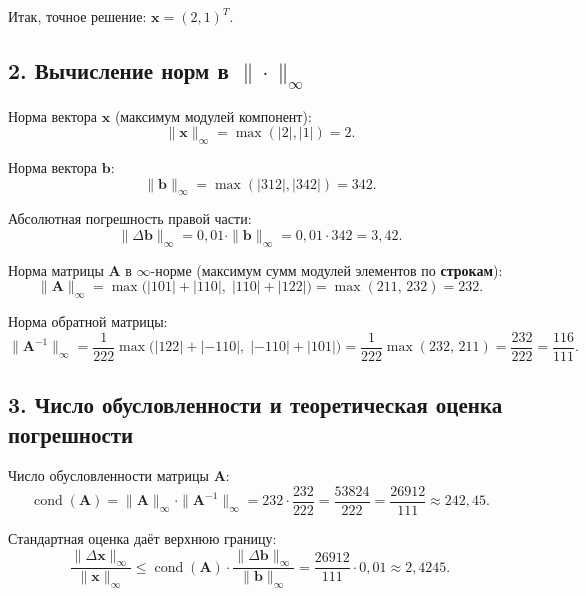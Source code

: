 \documentclass{article}
\begin{document}
Итак, точное решение: $\mathbf{x} = (2, 1)^T$.

\subsection*{2. Вычисление норм в $\|\cdot\|_\infty$}

Норма вектора $\mathbf{x}$ (максимум модулей компонент):
\begin{equation}
\|\mathbf{x}\|_\infty = \max(|2|, |1|) = 2.
\end{equation}

Норма вектора $\mathbf{b}$:
\begin{equation}
\|\mathbf{b}\|_\infty = \max(|312|, |342|) = 342.
\end{equation}

Абсолютная погрешность правой части:
\begin{equation}
\|\Delta\mathbf{b}\|_\infty = 0{,}01 \cdot \|\mathbf{b}\|_\infty = 0{,}01 \cdot 342 = 3{,}42.
\end{equation}

Норма матрицы $\mathbf{A}$ в $\infty$-норме (максимум сумм модулей элементов по \textbf{строкам}):
\begin{equation}
\|\mathbf{A}\|_\infty = \max\bigl(|101| + |110|,\; |110| + |122|\bigr) = \max(211,\, 232) = 232.
\end{equation}

Норма обратной матрицы:
\begin{equation}
\|\mathbf{A}^{-1}\|_\infty = \frac{1}{222} \max\bigl(|122| + |-110|,\; |-110| + |101|\bigr) = \frac{1}{222} \max(232,\, 211) = \frac{232}{222} = \frac{116}{111}.
\end{equation}

\subsection*{3. Число обусловленности и теоретическая оценка погрешности}

Число обусловленности матрицы $\mathbf{A}$:
\begin{equation}
\operatorname{cond}(\mathbf{A}) = \|\mathbf{A}\|_\infty \cdot \|\mathbf{A}^{-1}\|_\infty = 232 \cdot \frac{232}{222} = \frac{53824}{222} = \frac{26912}{111} \approx 242{,}45.
\end{equation}

Стандартная оценка даёт верхнюю границу:
\begin{equation}
\frac{\|\Delta\mathbf{x}\|_\infty}{\|\mathbf{x}\|_\infty} \leqslant \operatorname{cond}(\mathbf{A}) \cdot \frac{\|\Delta\mathbf{b}\|_\infty}{\|\mathbf{b}\|_\infty} = \frac{26912}{111} \cdot 0{,}01 \approx 2{,}4245.
\end{equation}
\end{document}
